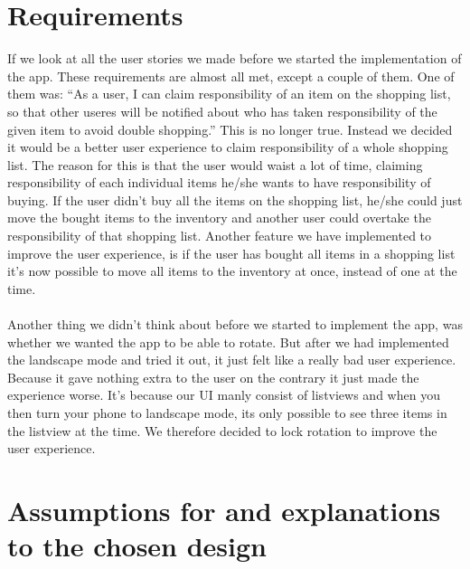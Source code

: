 \documentclass[12pt]{article}
\begin{document}
\section{Requirements}
If we look at all the user stories we made before we started the implementation of the app. These requirements are almost all met, except a couple of them. One of them was: “As a user, I can claim responsibility of an item on the shopping list, so that other useres will be notified about who has taken responsibility of the given item to avoid double shopping.” This is no longer true. Instead we decided it would be a better user experience to claim responsibility of a whole shopping list. The reason for this is that the user would waist a lot of time, claiming responsibility of each individual items he/she wants to have responsibility of buying. If the user didn’t buy all the items on the shopping list, he/she could just move the bought items to the inventory and another user could overtake the responsibility of that shopping list. 
Another feature we have implemented to improve the user experience, is if the user has bought all items in a shopping list it’s now possible to move all items to the inventory at once, instead of one at the time.  
\\
\\
Another thing we didn’t think about before we started to implement the app, was whether we wanted the app to be able to rotate. But after we had implemented the landscape mode and tried it out, it just felt like a really bad user experience. Because it gave nothing extra to the user on the contrary it just made the experience worse. It’s because our UI manly consist of listviews and when you then turn your phone to landscape mode, its only possible to see three items in the listview at the time. We therefore decided to lock rotation to improve the user experience.
\section{Assumptions for and explanations to the chosen design}
\end{document}
